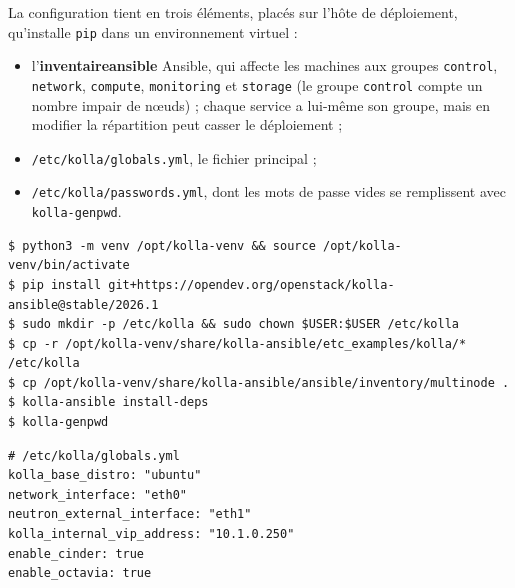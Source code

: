 La configuration tient en trois éléments, placés sur l'hôte de déploiement, qu'installe \texttt{pip} dans un environnement virtuel
\parencite{kolla-ansible-quickstart} :
\begin{itemize}
  \item l'\textbf{\gls{inventaireansible}} Ansible, qui affecte les machines aux groupes \texttt{control}, \texttt{network}, \texttt{compute},
        \texttt{monitoring} et \texttt{storage} (le groupe \texttt{control} compte un nombre impair de nœuds) ; chaque service a lui-même
        son groupe, mais en modifier la répartition peut casser le déploiement \parencite{kolla-ansible-multinode,kolla-ansible-production} ;
  \item \texttt{/etc/kolla/globals.yml}, le fichier principal ;
  \item \texttt{/etc/kolla/passwords.yml}, dont les mots de passe vides se remplissent avec \texttt{kolla-genpwd}.
\end{itemize}

\par\noindent\begin{minipage}{\linewidth}
\begin{lstlisting}[style=terminal]
$ python3 -m venv /opt/kolla-venv && source /opt/kolla-venv/bin/activate
$ pip install git+https://opendev.org/openstack/kolla-ansible@stable/2026.1
$ sudo mkdir -p /etc/kolla && sudo chown $USER:$USER /etc/kolla
$ cp -r /opt/kolla-venv/share/kolla-ansible/etc_examples/kolla/* /etc/kolla
$ cp /opt/kolla-venv/share/kolla-ansible/ansible/inventory/multinode .
$ kolla-ansible install-deps
$ kolla-genpwd
\end{lstlisting}
\end{minipage}\par

\par\noindent\begin{minipage}{\linewidth}
\begin{lstlisting}
# /etc/kolla/globals.yml
kolla_base_distro: "ubuntu"
network_interface: "eth0"
neutron_external_interface: "eth1"
kolla_internal_vip_address: "10.1.0.250"
enable_cinder: true
enable_octavia: true
\end{lstlisting}
\end{minipage}\par


